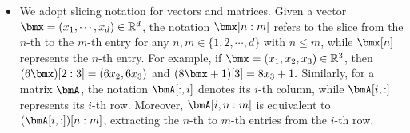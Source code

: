 \documentclass[11pt,a4paper]{article}
\let\dots\cdots
\begin{document}
\begin{itemize}
    \item We adopt slicing notation for vectors and matrices. Given a vector $\bmx = (x_1, \dots, x_d) \in \mathbb{R}^d$, the notation $\bmx[n:m]$ refers to the slice from the $n$-th to the $m$-th entry for any $n, m \in \{1,2,\dots,d\}$ with $n \leq m$, while $\bmx[n]$ represents the $n$-th entry. For example, if $\bmx = (x_1, x_2, x_3) \in \mathbb{R}^3$, then 
    \(    (6\bmx)[2:3] = (6x_2, 6x_3)\) and \( (8\bmx+1)[3] = 8x_3 + 1.\)
    Similarly, for a matrix $\bmA$, the notation $\bmA[:,i]$ denotes its $i$-th column, while $\bmA[i,:]$ represents its $i$-th row. Moreover, $\bmA[i,n:m]$ is equivalent to $(\bmA[i,:])[n:m]$, extracting the $n$-th to $m$-th entries from the $i$-th row.


    






\end{itemize}
\end{document}

